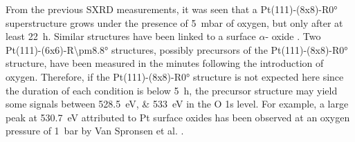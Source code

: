 From the previous SXRD measurements, it was seen that a Pt(111)-(8x8)-R\ang{0} superstructure grows under the presence of \qty{5}{\milli\bar} of oxygen, but only after at least \qty{22}{\hour}.
Similar structures have been linked to a surface $\alpha$- oxide \parencite{Ackermann2007, Ellinger2008}.
Two Pt(111)-(6x6)-R\ang{\pm8.8} structures, possibly precursors of the Pt(111)-(8x8)-R\ang{0} structure, have been measured in the minutes following the introduction of oxygen.
Therefore, if the Pt(111)-(8x8)-R\ang{0} structure is not expected here since the duration of each condition is below \qty{5}{\hour}, the precursor structure may yield some signals between \qtylist{528.5;533}{\eV} in the O 1s level.
For example, a large peak at \qty{530.7}{\eV} attributed to Pt surface oxides has been observed at an oxygen pressure of \qty{1}{\bar} by Van Spronsen et al. \parencite{VanSpronsen2017}.

